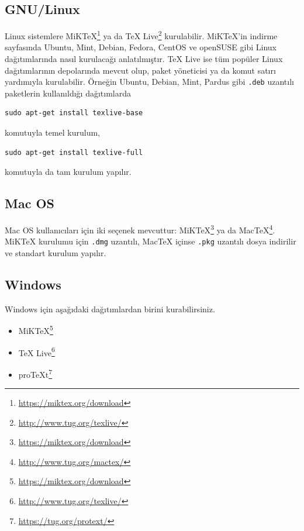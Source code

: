 \documentclass[
  10pt,
]{scrbook}
\providecommand{\tightlist}{%
  \setlength{\itemsep}{0pt}\setlength{\parskip}{0pt}}
\renewcommand{\href}[2]{#2\footnote{\url{#1}}}
\theoremstyle{definition}
\theoremstyle{definition}
\theoremstyle{definition}
\theoremstyle{definition}
\theoremstyle{remark}
\begin{document}
\hypertarget{gnulinux}{%
\subsection{GNU/Linux}\label{gnulinux}}

Linux sistemlere \href{https://miktex.org/download}{MiKTeX} ya da \href{http://www.tug.org/texlive/}{TeX
Live} kurulabilir. MiKTeX'in indirme sayfasında Ubuntu, Mint,
Debian, Fedora, CentOS ve openSUSE gibi Linux dağıtımlarında nasıl
kurulacağı anlatılmıştır. TeX Live ise tüm popüler Linux dağıtımlarının
depolarında mevcut olup, paket yöneticisi ya da komut satırı yardımıyla
kurulabilir. Örneğin Ubuntu, Debian, Mint, Pardus gibi \texttt{.deb} uzantılı
paketlerin kullanıldığı dağıtımlarda

\begin{verbatim}
sudo apt-get install texlive-base
\end{verbatim}

komutuyla temel kurulum,

\begin{verbatim}
sudo apt-get install texlive-full
\end{verbatim}

komutuyla da tam kurulum yapılır.

\hypertarget{mac-os}{%
\subsection{Mac OS}\label{mac-os}}

Mac OS kullanıcıları için iki seçenek mevcuttur:
\href{https://miktex.org/download}{MiKTeX} ya da
\href{http://www.tug.org/mactex/}{MacTeX}. MiKTeX kurulumu için \texttt{.dmg} uzantılı, MacTeX içinse
\texttt{.pkg} uzantılı dosya indirilir ve standart kurulum yapılır.

\hypertarget{windows}{%
\subsection{Windows}\label{windows}}

Windows için aşağıdaki dağıtımlardan birini kurabilirsiniz.

\begin{itemize}
\tightlist
\item
  \href{https://miktex.org/download}{MiKTeX}
\item
  \href{http://www.tug.org/texlive/}{TeX Live}
\item
  \href{https://tug.org/protext/}{proTeXt}
\end{itemize}
\end{document}
